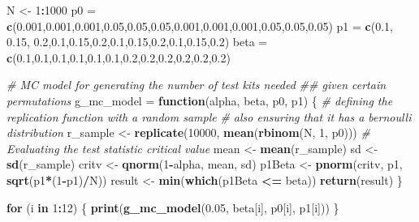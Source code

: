 \documentclass[
  12pt,
  landscape]{article}
\newenvironment{Shaded}{\begin{snugshade}}{\end{snugshade}}
\newcommand{\CommentTok}[1]{\textcolor[rgb]{0.56,0.35,0.01}{\textit{#1}}}
\newcommand{\ControlFlowTok}[1]{\textcolor[rgb]{0.13,0.29,0.53}{\textbf{#1}}}
\newcommand{\DecValTok}[1]{\textcolor[rgb]{0.00,0.00,0.81}{#1}}
\newcommand{\FloatTok}[1]{\textcolor[rgb]{0.00,0.00,0.81}{#1}}
\newcommand{\KeywordTok}[1]{\textcolor[rgb]{0.13,0.29,0.53}{\textbf{#1}}}
\newcommand{\NormalTok}[1]{#1}
\newcommand{\OperatorTok}[1]{\textcolor[rgb]{0.81,0.36,0.00}{\textbf{#1}}}
\newcommand{\StringTok}[1]{\textcolor[rgb]{0.31,0.60,0.02}{#1}}
\begin{document}
\begin{Shaded}
\begin{Highlighting}[]
\NormalTok{N <-}\StringTok{ }\DecValTok{1}\OperatorTok{:}\DecValTok{1000}
\NormalTok{p0 =}\StringTok{ }\KeywordTok{c}\NormalTok{(}\FloatTok{0.001}\NormalTok{,}\FloatTok{0.001}\NormalTok{,}\FloatTok{0.001}\NormalTok{,}\FloatTok{0.05}\NormalTok{,}\FloatTok{0.05}\NormalTok{,}\FloatTok{0.05}\NormalTok{,}\FloatTok{0.001}\NormalTok{,}\FloatTok{0.001}\NormalTok{,}\FloatTok{0.001}\NormalTok{,}\FloatTok{0.05}\NormalTok{,}\FloatTok{0.05}\NormalTok{,}\FloatTok{0.05}\NormalTok{)}
\NormalTok{p1 =}\StringTok{ }\KeywordTok{c}\NormalTok{(}\FloatTok{0.1}\NormalTok{, }\FloatTok{0.15}\NormalTok{, }\FloatTok{0.2}\NormalTok{,}\FloatTok{0.1}\NormalTok{,}\FloatTok{0.15}\NormalTok{,}\FloatTok{0.2}\NormalTok{,}\FloatTok{0.1}\NormalTok{,}\FloatTok{0.15}\NormalTok{,}\FloatTok{0.2}\NormalTok{,}\FloatTok{0.1}\NormalTok{,}\FloatTok{0.15}\NormalTok{,}\FloatTok{0.2}\NormalTok{)}
\NormalTok{beta =}\StringTok{ }\KeywordTok{c}\NormalTok{(}\FloatTok{0.1}\NormalTok{,}\FloatTok{0.1}\NormalTok{,}\FloatTok{0.1}\NormalTok{,}\FloatTok{0.1}\NormalTok{,}\FloatTok{0.1}\NormalTok{,}\FloatTok{0.1}\NormalTok{,}\FloatTok{0.2}\NormalTok{,}\FloatTok{0.2}\NormalTok{,}\FloatTok{0.2}\NormalTok{,}\FloatTok{0.2}\NormalTok{,}\FloatTok{0.2}\NormalTok{,}\FloatTok{0.2}\NormalTok{)}

\CommentTok{# MC model for generating the number of test kits needed }
\CommentTok{## given certain permutations}
\NormalTok{g_mc_model =}\StringTok{ }\ControlFlowTok{function}\NormalTok{(alpha, beta, p0, p1) \{}
  \CommentTok{# defining the replication function with a random sample }
  \CommentTok{# also ensuring that it has a bernoulli distribution}
\NormalTok{  r_sample <-}\StringTok{ }\KeywordTok{replicate}\NormalTok{(}\DecValTok{10000}\NormalTok{, }\KeywordTok{mean}\NormalTok{(}\KeywordTok{rbinom}\NormalTok{(N, }\DecValTok{1}\NormalTok{, p0)))}
  \CommentTok{# Evaluating the test statistic critical value}
\NormalTok{  mean <-}\StringTok{ }\KeywordTok{mean}\NormalTok{(r_sample)}
\NormalTok{  sd <-}\StringTok{ }\KeywordTok{sd}\NormalTok{(r_sample)}
\NormalTok{  critv <-}\StringTok{ }\KeywordTok{qnorm}\NormalTok{(}\DecValTok{1}\OperatorTok{-}\NormalTok{alpha, mean, sd)}
\NormalTok{  p1Beta <-}\StringTok{ }\KeywordTok{pnorm}\NormalTok{(critv, p1, }\KeywordTok{sqrt}\NormalTok{(p1}\OperatorTok{*}\NormalTok{(}\DecValTok{1}\OperatorTok{-}\NormalTok{p1)}\OperatorTok{/}\NormalTok{N)) }
\NormalTok{  result <-}\StringTok{ }\KeywordTok{min}\NormalTok{(}\KeywordTok{which}\NormalTok{(p1Beta }\OperatorTok{<=}\StringTok{ }\NormalTok{beta)) }
  \KeywordTok{return}\NormalTok{(result)}
\NormalTok{\}}

\ControlFlowTok{for}\NormalTok{ (i }\ControlFlowTok{in} \DecValTok{1}\OperatorTok{:}\DecValTok{12}\NormalTok{) \{}
  \KeywordTok{print}\NormalTok{(}\KeywordTok{g_mc_model}\NormalTok{(}\FloatTok{0.05}\NormalTok{, beta[i], p0[i], p1[i])) }
\NormalTok{  \}}
\end{Highlighting}
\end{Shaded}
\end{document}
